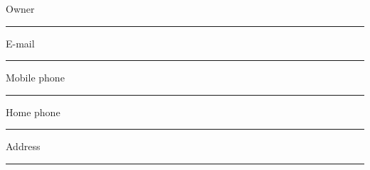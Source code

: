 \thispagestyle{empty}

\noindent
Owner \
\vspace{-.1in} \\ \rule{\textwidth}{.2pt}
\vspace{.5in}

\noindent E-mail \
\vspace{-.1in} \\ \rule{\textwidth}{.2pt}
\vspace{.5in}

\noindent Mobile phone \
\vspace{-.1in} \\ \rule{\textwidth}{.2pt}
\vspace{.5in}

\noindent Home phone \
\vspace{-.1in} \\ \rule{\textwidth}{.2pt}
\vspace{.5in}

\noindent Address \
\vspace{-.1in} \\ \rule{\textwidth}{.2pt}

\vspace{0.75in}

